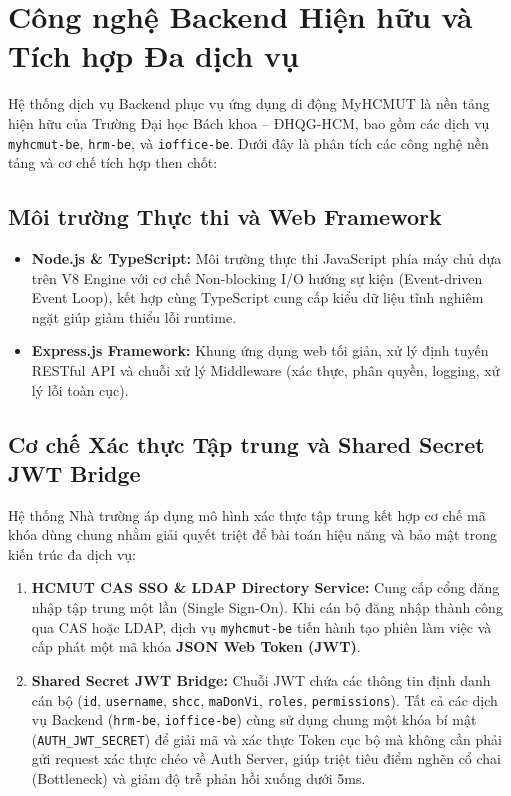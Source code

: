 \section{Công nghệ Backend Hiện hữu và Tích hợp Đa dịch vụ}
\label{sec:backend_tech}

Hệ thống dịch vụ Backend phục vụ ứng dụng di động MyHCMUT là nền tảng hiện hữu của Trường Đại học Bách khoa -- ĐHQG-HCM, bao gồm các dịch vụ \texttt{myhcmut-be}, \texttt{hrm-be}, và \texttt{ioffice-be}. Dưới đây là phân tích các công nghệ nền tảng và cơ chế tích hợp then chốt:

\subsection{Môi trường Thực thi và Web Framework}
\begin{itemize}
    \item \textbf{Node.js \& TypeScript:} Môi trường thực thi JavaScript phía máy chủ dựa trên V8 Engine với cơ chế Non-blocking I/O hướng sự kiện (Event-driven Event Loop), kết hợp cùng TypeScript cung cấp kiểu dữ liệu tĩnh nghiêm ngặt giúp giảm thiểu lỗi runtime.
    \item \textbf{Express.js Framework:} Khung ứng dụng web tối giản, xử lý định tuyến RESTful API và chuỗi xử lý Middleware (xác thực, phân quyền, logging, xử lý lỗi toàn cục).
\end{itemize}

\subsection{Cơ chế Xác thực Tập trung và Shared Secret JWT Bridge}
Hệ thống Nhà trường áp dụng mô hình xác thực tập trung kết hợp cơ chế mã khóa dùng chung nhằm giải quyết triệt để bài toán hiệu năng và bảo mật trong kiến trúc đa dịch vụ:
\begin{enumerate}
    \item \textbf{HCMUT CAS SSO & LDAP Directory Service:} Cung cấp cổng đăng nhập tập trung một lần (Single Sign-On). Khi cán bộ đăng nhập thành công qua CAS hoặc LDAP, dịch vụ \texttt{myhcmut-be} tiến hành tạo phiên làm việc và cấp phát một mã khóa \textbf{JSON Web Token (JWT)}.
    \item \textbf{Shared Secret JWT Bridge:} Chuỗi JWT chứa các thông tin định danh cán bộ (\texttt{id}, \texttt{username}, \texttt{shcc}, \texttt{maDonVi}, \texttt{roles}, \texttt{permissions}). Tất cả các dịch vụ Backend (\texttt{hrm-be}, \texttt{ioffice-be}) cùng sử dụng chung một khóa bí mật (\texttt{AUTH\_JWT\_SECRET}) để giải mã và xác thực Token cục bộ mà không cần phải gửi request xác thực chéo về Auth Server, giúp triệt tiêu điểm nghẽn cổ chai (Bottleneck) và giảm độ trễ phản hồi xuống dưới 5ms.
\end{enumerate}

